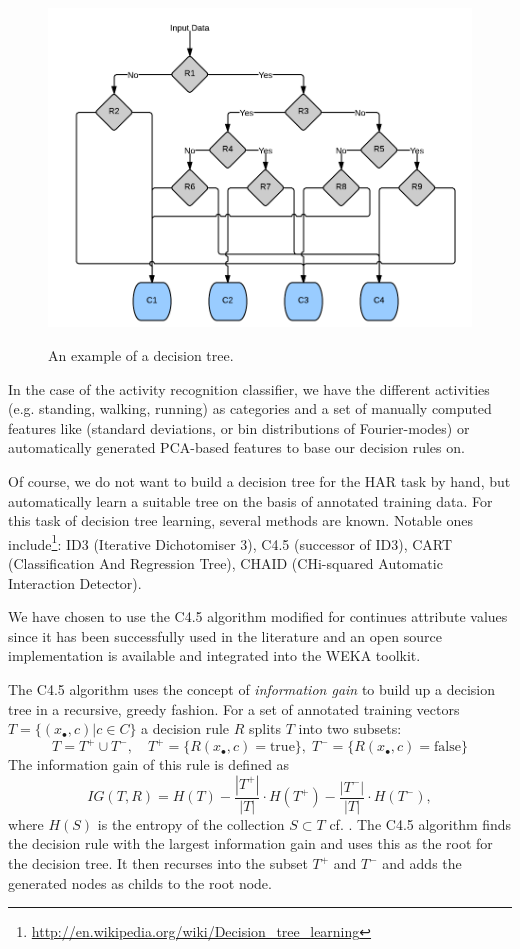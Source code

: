 \begin{figure}[h]
\centering
\includegraphics[width=0.5 \textwidth]{img/har/decision_tree.png}
\label{fig:decision_tree}
\caption{An example of a decision tree.}
\end{figure}

In the case of the activity recognition classifier, we have the
different activities (e.g. standing, walking, running) as 
categories and a set of manually computed features like (standard
deviations, or bin distributions of Fourier-modes) or automatically
generated PCA-based features to base our decision rules on.

Of course, we do not want to build a decision tree for the HAR task by
hand, but automatically learn a suitable tree on the basis of
annotated training data. For this task of decision tree learning,
several methods are known. Notable ones
include\footnote{\url{http://en.wikipedia.org/wiki/Decision_tree_learning}}:
ID3 (Iterative Dichotomiser 3), C4.5 (successor of ID3), CART
(Classification And Regression Tree), CHAID (CHi-squared Automatic
Interaction Detector).

We have chosen to use the C4.5 algorithm modified for continues
attribute values \cite{quinlan1996improved} since it has been
successfully used in the literature \cite{lara12} and an open source
implementation is available and integrated into the WEKA toolkit.

The C4.5 algorithm uses the concept of {\it information gain} to build
up a decision tree in a recursive, greedy fashion.  For a set of
annotated training vectors $T = \{ (x_\bullet, c) | c \in C \}$ a
decision rule $R$ splits $T$ into two subsets:
\[ T = T^+ \cup T^{-}, \quad T^+ = \{ R(x_\bullet, c) = \text{true}\}, \;
T^- = \{ R(x_\bullet, c) = \text{false} \} \]
The information gain of this rule is defined as 
\[ IG(T,R) = H(T) - \frac{|T^+|}{|T|} \cdot H(T^+) - \frac{|T^-|}{|T|} \cdot H(T^-), \]
where $H(S)$ is the entropy of the collection $S \subset T$
cf. \cite{Shannon1948}. The C4.5 algorithm finds the decision rule
with the largest information gain and uses this as the root for the
decision tree. It then recurses into the subset $T^+$ and $T^-$ and
adds the generated nodes as childs to the root node.

